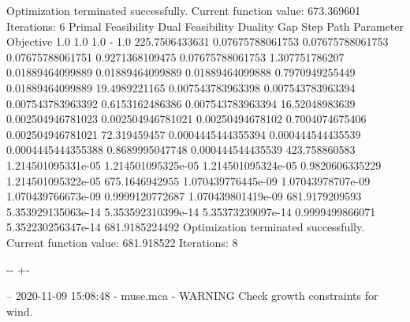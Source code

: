 \documentclass[letterpaper,10pt,english]{sphinxmanual}
\newlength\nbsphinxcodecellspacing
\begin{document}
{\begin{sphinxVerbatim}[commandchars=\\\{\}]
Optimization terminated successfully.
         Current function value: 673.369601
         Iterations: 6
Primal Feasibility  Dual Feasibility    Duality Gap         Step             Path Parameter      Objective
1.0                 1.0                 1.0                 -                1.0                 225.7506433631
0.07675788061753    0.07675788061753    0.07675788061751    0.9271368109475  0.07675788061753    1.307751786207
0.01889464099889    0.01889464099889    0.01889464099888    0.7970949255449  0.01889464099889    19.4989221165
0.007543783963398   0.007543783963394   0.007543783963392   0.6153162486386  0.007543783963394   16.52048983639
0.002504946781023   0.002504946781021   0.00250494678102    0.7004074675406  0.002504946781021   72.319459457
0.0004445444355394  0.000444544435539   0.0004445444355388  0.8689995047748  0.000444544435539   423.758860583
1.214501095331e-05  1.214501095325e-05  1.214501095324e-05  0.9820606335229  1.214501095322e-05  675.1646942955
1.070439776445e-09  1.07043978707e-09   1.070439766673e-09  0.9999120772687  1.070439801419e-09  681.9179209593
5.353929135063e-14  5.353592310399e-14  5.35373239097e-14   0.9999499866071  5.352230256347e-14  681.9185224492
Optimization terminated successfully.
         Current function value: 681.918522
         Iterations: 8
\end{sphinxVerbatim}
}

{

\kern-\sphinxverbatimsmallskipamount\kern-\baselineskip
\kern+\FrameHeightAdjust\kern-\fboxrule
\vspace{\nbsphinxcodecellspacing}

\begin{sphinxVerbatim}[commandchars=\\\{\}]
-- 2020-11-09 15:08:48 - muse.mca - WARNING
Check growth constraints for wind.

\end{sphinxVerbatim}
}
\end{document}
